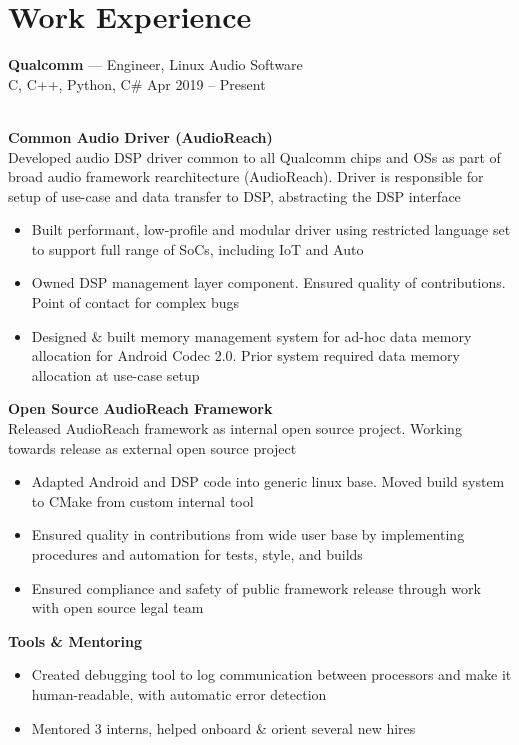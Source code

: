 \documentclass[letterpaper,10pt]{article}
\newcommand{\comment}[1]{}
\newcommand{\jobtitle}[4]{
    {\large \textbf{#1} --- #2\\}
    {\footnotesize#3 \hfill #4}
}
\begin{document}
\begin{minipage}[t]{0.6\textwidth} %


\section{Work Experience}
\medskip

\jobtitle{Qualcomm}{Engineer, Linux Audio Software}{C, C++, Python, C\#}{Apr 2019 -- Present}
\smallskip
\\
\textbf{Common Audio Driver (AudioReach)}
\\
Developed audio DSP driver common to all Qualcomm chips and OSs as part of broad audio framework rearchitecture (AudioReach). Driver is responsible for setup of use-case and data transfer to DSP, abstracting the DSP interface

\begin{itemize}
    \item {Built performant, low-profile and modular driver using restricted language set to support full range of SoCs, including IoT and Auto}
    \item {Owned DSP management layer component. Ensured quality of contributions. Point of contact for complex bugs}
    \item {Designed \& built memory management system for ad-hoc data memory allocation for Android Codec 2.0. Prior system required data memory allocation at use-case setup} 
\end{itemize}
\smallskip
\textbf{Open Source AudioReach Framework}
\\
Released AudioReach framework as internal open source project. Working towards release as external open source project
\begin{itemize}
	\item {Adapted Android and DSP code into generic linux base. Moved build system to CMake from custom internal tool}
	\item {Ensured quality in contributions from wide user base by implementing procedures and automation for tests, style, and builds}
	\item {Ensured compliance and safety of public framework release through work with open source legal team}
\end{itemize}
\smallskip
\textbf{Tools \& Mentoring}
\begin{itemize}
    \item {Created debugging tool to log communication between processors and make it human-readable, with automatic error detection}
    \item {Mentored 3 interns, helped onboard \& orient several new hires}
\comment{TODO: Impact statements. Double indented list?}


\end{itemize}
\end{minipage}
\end{document}
